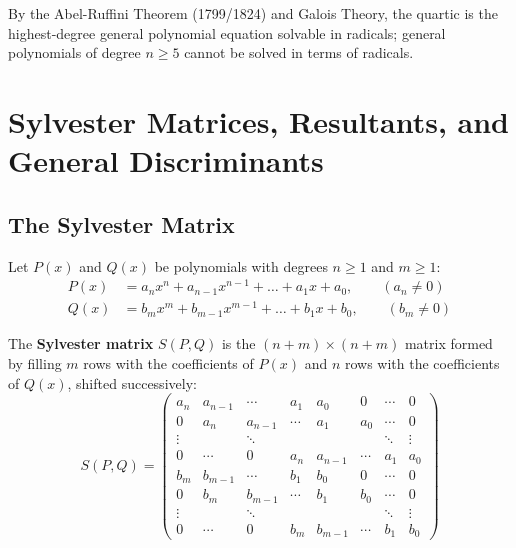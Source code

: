 \documentclass[a4paper]{article}
\begin{document}
\begin{remark}
By the Abel-Ruffini Theorem (1799/1824) and Galois Theory, the quartic is the highest-degree general polynomial equation solvable in radicals; general polynomials of degree $n \ge 5$ cannot be solved in terms of radicals.
\end{remark}


\section{Sylvester Matrices, Resultants, and General Discriminants}\label{eps:sec:sylvester-resultants}

\subsection{The Sylvester Matrix}

Let $P(x)$ and $Q(x)$ be polynomials with degrees $n \ge 1$ and $m \ge 1$:
\begin{align}
    P(x) &= a_n x^n + a_{n-1} x^{n-1} + \dots + a_1 x + a_0, \qquad (a_n \ne 0) \\
    Q(x) &= b_m x^m + b_{m-1} x^{m-1} + \dots + b_1 x + b_0, \qquad (b_m \ne 0)
\end{align}

\begin{definition}\label{eps:def:sylvester-matrix}
The \textbf{Sylvester matrix} $S(P, Q)$ is the $(n+m) \times (n+m)$ matrix formed by filling $m$ rows with the coefficients of $P(x)$ and $n$ rows with the coefficients of $Q(x)$, shifted successively:
\begin{equation}
    S(P, Q) = 
    \begin{pmatrix}
        a_n & a_{n-1} & \cdots & a_1 & a_0 & 0 & \cdots & 0 \\
        0 & a_n & a_{n-1} & \cdots & a_1 & a_0 & \cdots & 0 \\
        \vdots & & \ddots & & & & \ddots & \vdots \\
        0 & \cdots & 0 & a_n & a_{n-1} & \cdots & a_1 & a_0 \\
        b_m & b_{m-1} & \cdots & b_1 & b_0 & 0 & \cdots & 0 \\
        0 & b_m & b_{m-1} & \cdots & b_1 & b_0 & \cdots & 0 \\
        \vdots & & \ddots & & & & \ddots & \vdots \\
        0 & \cdots & 0 & b_m & b_{m-1} & \cdots & b_1 & b_0
    \end{pmatrix}
\end{equation}
\end{definition}
\end{document}
